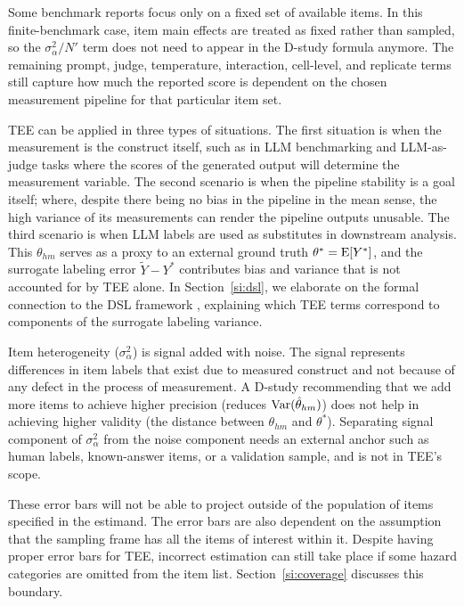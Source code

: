 Some benchmark reports focus only on a fixed set of available items. In this finite-benchmark case, item main effects are treated as fixed rather than sampled, so the $\sigma^2_\alpha/N'$ term does not need to appear in the D-study formula anymore. The remaining prompt, judge, temperature, interaction, cell-level, and replicate terms still capture how much the reported score is dependent on the chosen measurement pipeline for that particular item set.

TEE can be applied in three types of situations. The first situation is when the measurement is the construct itself, such as in LLM benchmarking and LLM-as-judge tasks where the scores of the generated output will determine the measurement variable. The second scenario is when the pipeline stability is a goal itself; where, despite there being no bias in the pipeline in the mean sense, the high variance of its measurements can render the pipeline outputs unusable. The third scenario is when LLM labels are used as substitutes in downstream analysis. This $\theta_{hm}$ serves as a proxy to an external ground truth $\theta^* = \operatorname{E}[Y^*]$, and the surrogate labeling error $\tilde{Y} - Y^*$ contributes bias and variance that is not accounted for by TEE alone. In Section~\ref{si:dsl}, we elaborate on the formal connection to the DSL framework \citep{egami2024dsl}, explaining which TEE terms correspond to components of the surrogate labeling variance.

Item heterogeneity ($\sigma^2_\alpha$) is signal added with noise. The signal represents differences in item labels that exist due to measured construct and not because of any defect in the process of measurement. A D-study recommending that we add more items to achieve higher precision (reduces $\operatorname{Var}(\hat\theta_{hm})$) does not help in achieving higher validity (the distance between $\theta_{hm}$ and $\theta^*$). Separating signal component of $\sigma^2_\alpha$ from the noise component needs an external anchor such as human labels, known-answer items, or a validation sample, and is not in TEE's scope.

These error bars will not be able to project outside of the population of items specified in the estimand. The error bars are also dependent on the assumption that the sampling frame has all the items of interest within it. Despite having proper error bars for TEE, incorrect estimation can still take place if some hazard categories are omitted from the item list. Section~\ref{si:coverage} discusses this boundary.

